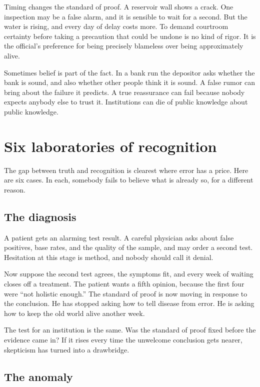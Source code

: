 \documentclass[12pt,a4paper]{book}
\begin{document}
Timing changes the standard of proof. A reservoir wall shows a crack. One inspection may be a false alarm, and it is sensible to wait for a second. But the water is rising, and every day of delay costs more. To demand courtroom certainty before taking a precaution that could be undone is no kind of rigor. It is the official's preference for being precisely blameless over being approximately alive.

Sometimes belief is part of the fact. In a bank run the depositor asks whether the bank is sound, and also whether other people think it is sound. A false rumor can bring about the failure it predicts. A true reassurance can fail because nobody expects anybody else to trust it. Institutions can die of public knowledge about public knowledge.

\section{Six laboratories of recognition}

The gap between truth and recognition is clearest where error has a price. Here are six cases. In each, somebody fails to believe what is already so, for a different reason.

\subsection{The diagnosis}

A patient gets an alarming test result. A careful physician asks about false positives, base rates, and the quality of the sample, and may order a second test. Hesitation at this stage is method, and nobody should call it denial.

Now suppose the second test agrees, the symptoms fit, and every week of waiting closes off a treatment. The patient wants a fifth opinion, because the first four were ``not holistic enough.'' The standard of proof is now moving in response to the conclusion. He has stopped asking how to tell disease from error. He is asking how to keep the old world alive another week.

The test for an institution is the same. Was the standard of proof fixed before the evidence came in? If it rises every time the unwelcome conclusion gets nearer, skepticism has turned into a drawbridge.

\subsection{The anomaly}
\end{document}
